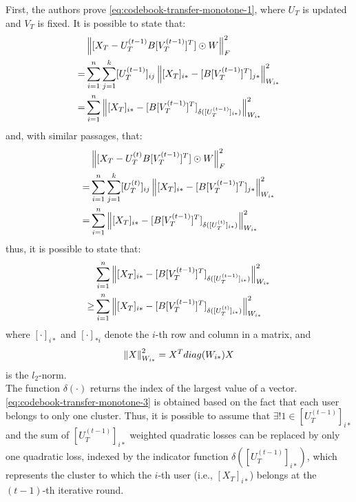 First, the authors prove \autoref{eq:codebook-transfer-monotone-1}, where $U_T$ is updated and $V_T$ is fixed. It is possible to state that:
\begin{equation}
\label{eq:codebook-transfer-monotone-3}
\begin{split}
& \left\lVert[X_T - U_T^{(t - 1)} B [V_T^{(t - 1)}]^T] \odot W\right\rVert_F^2 \\
= & \sum_{i = 1}^{n} \sum_{j = 1}^{k} [U_T^{(t - 1)}]_{ij} \left\lVert[X_T]_{i*} - [B [V_T^{(t - 1)}]^T]_{j*}\right\rVert_{W_{i*}}^2 \\
= & \sum_{i = 1}^{n} \left\lVert[X_T]_{i*} - [B [V_T^{(t - 1)}]^T]_{\delta([U_T^{(t - 1)}]_{i*})}\right\rVert_{W_{i*}}^2
\end{split}
\end{equation}
and, with similar passages, that:
\begin{equation}
\begin{split}
& \left\lVert[X_T - U_T^{(t)} B [V_T^{(t - 1)}]^T] \odot W\right\rVert_F^2 \\
= & \sum_{i = 1}^{n} \sum_{j = 1}^{k} [U_T^{(t)}]_{ij} \left\lVert[X_T]_{i*} - [B [V_T^{(t - 1)}]^T]_{j*}\right\rVert_{W_{i*}}^2 \\
= & \sum_{i = 1}^{n} \left\lVert[X_T]_{i*} - [B [V_T^{(t - 1)}]^T]_{\delta([U_T^{(t)}]_{i*})}\right\rVert_{W_{i*}}^2
\end{split}
\end{equation}
thus, it is possible to state that:
\begin{equation}
\begin{split}
& \sum_{i = 1}^{n} \left\lVert[X_T]_{i*} - [B [V_T^{(t - 1)}]^T]_{\delta([U_T^{(t - 1)}]_{i*})}\right\rVert_{W_{i*}}^2 \\
\geq & \sum_{i = 1}^{n} \left\lVert[X_T]_{i*} - [B [V_T^{(t - 1)}]^T]_{\delta([U_T^{(t)}]_{i*})}\right\rVert_{W_{i*}}^2
\end{split}
\end{equation}
where $[\cdot]_{i*}$ and $[\cdot]_{*i}$ denote the $i$-th row and column in a matrix, and
\begin{equation*}
\left\lVert X\right\rVert_{W_{i*}}^2 = X^T diag(W_{i*}) X
\end{equation*}
is the $l_2$-norm.\\
The function $\delta(\cdot)$ returns the index of the largest value of a vector.\\
\autoref{eq:codebook-transfer-monotone-3} is obtained based on the fact that each user belongs to only one cluster. Thus, it is possible to assume that $\exists! 1 \in [U_T^{(t - 1)}]_{i*}$ and the sum of $[U_T^{(t - 1)}]_{i*}$ weighted quadratic losses can be replaced by only one quadratic loss, indexed by the indicator function $\delta([U_T^{(t - 1)}]_{i*})$, which represents the cluster to which the $i$-th user (i.e., $[X_T]_{i*}$) belongs at the $(t-1)$-th iterative round.\\
